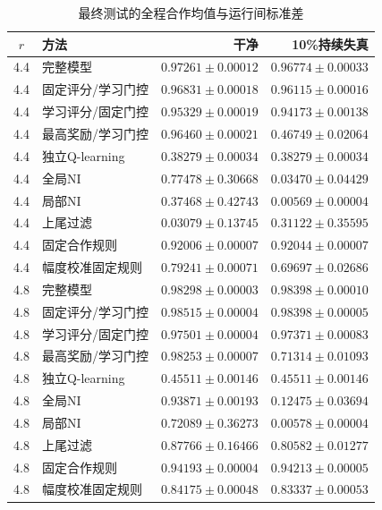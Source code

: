 \begin{table}[!htbp]
\centering\small
\caption{最终测试的全程合作均值与运行间标准差}
\label{tab:w2-final-whole}
\begin{tabular}{clrr}
\toprule
$r$ & 方法 & 干净 & 10\%持续失真 \\
\midrule
4.4 & 完整模型 & $0.97261\pm0.00012$ & $0.96774\pm0.00033$ \\
4.4 & 固定评分/学习门控 & $0.96831\pm0.00018$ & $0.96115\pm0.00016$ \\
4.4 & 学习评分/固定门控 & $0.95329\pm0.00019$ & $0.94173\pm0.00138$ \\
4.4 & 最高奖励/学习门控 & $0.96460\pm0.00021$ & $0.46749\pm0.02064$ \\
4.4 & 独立Q-learning & $0.38279\pm0.00034$ & $0.38279\pm0.00034$ \\
4.4 & 全局NI & $0.77478\pm0.30668$ & $0.03470\pm0.04429$ \\
4.4 & 局部NI & $0.37468\pm0.42743$ & $0.00569\pm0.00004$ \\
4.4 & 上尾过滤 & $0.03079\pm0.13745$ & $0.31122\pm0.35595$ \\
4.4 & 固定合作规则 & $0.92006\pm0.00007$ & $0.92044\pm0.00007$ \\
4.4 & 幅度校准固定规则 & $0.79241\pm0.00071$ & $0.69697\pm0.02686$ \\
\midrule
4.8 & 完整模型 & $0.98298\pm0.00003$ & $0.98398\pm0.00010$ \\
4.8 & 固定评分/学习门控 & $0.98515\pm0.00004$ & $0.98398\pm0.00005$ \\
4.8 & 学习评分/固定门控 & $0.97501\pm0.00004$ & $0.97371\pm0.00083$ \\
4.8 & 最高奖励/学习门控 & $0.98253\pm0.00007$ & $0.71314\pm0.01093$ \\
4.8 & 独立Q-learning & $0.45511\pm0.00146$ & $0.45511\pm0.00146$ \\
4.8 & 全局NI & $0.93871\pm0.00193$ & $0.12475\pm0.03694$ \\
4.8 & 局部NI & $0.72089\pm0.36273$ & $0.00578\pm0.00004$ \\
4.8 & 上尾过滤 & $0.87766\pm0.16466$ & $0.80582\pm0.01277$ \\
4.8 & 固定合作规则 & $0.94193\pm0.00004$ & $0.94213\pm0.00005$ \\
4.8 & 幅度校准固定规则 & $0.84175\pm0.00048$ & $0.83337\pm0.00053$ \\
\bottomrule
\end{tabular}
\par{}
\end{table}
